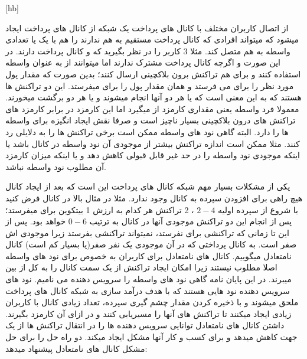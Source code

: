 [hb]



از اتصال کاربران مختلف با کانال های پرداخت یک شبکه از کانال های پرداخت ایجاد میشود که میتواند افرادی که کانال پرداخت مستقیم به هم ندارند را هم با یک یا تعدادی واسطه به هم متصل کند. مثلا 3 کاربر  را در نظر بگیرید که  و  کانال پرداخت دارند. در این صورت  و  اگرچه کانال پرداخت مشترک ندارند اما میتوانند از  به عنوان واسطه استفاده کنند و برای هم تراکنش برون بلاکچینی ارسال کنند؛ بدین صورت که  مقدار پول مورد نظر را برای  می فرستد و  همان مقدار پول را برای  میفرستد. این دو تراکنش ها  هستند که به این معنی است که یا هر دو آنها انجام میشوند و یا هر دو برگشت میخورند. معمولا فرد واسطه یعنی  مقداری کارمزد از   میگیرد اما این کارمزد در برابر کارمزد های تراکنش های درون بلاکچینی بسیار ناچیز است و صرفا نقش ایجاد انگیزه برای واسطه ها را دارد. البته گاهی نود های واسطه ممکن است برخی تراکنش ها را به دلایلی رد کنند. مثلا ممکن است اندازه تراکنش بیشتر از موجودی آن نود واسطه در کانال باشد یا اینکه موجودی نود واسطه را در حد غیر قابل قبولی کاهش دهد و یا اینکه میزان کارمزد آن مطلوب نود واسطه نباشد. 

یکی از مشکلات بسیار مهم شبکه کانال های پرداخت این است که بعد از ایجاد کانال هیچ راهی برای افزودن سپرده به کانال وجود ندارد. مثلا در مثال بالا در کانال  فرض کنید با شروع از سپرده اولیه
 $2-4$
 ، 2 تراکنش هر کدام به ارزش 1 بیتکوین برای  میفرستد؛ پس از انجام این دو تراکنش موجودی آنها در کانال به ترتیب
$0-6$   
خواهد بود. پس از این تا زمانی که   تراکنشی برای  نفرستد،  نمیتواند تراکنشی بفرستد زیرا موجودی اش صفر است. به کانال پرداختی که در آن موجودی یک نفر صفر(یا بسیار کم است) کانال نامتعادل  میگوییم. کانال های نامتعادل برای کاربران به خصوص برای نود های واسطه اصلا مطلوب نیستند زیرا امکان ایجاد تراکنش از یک سمت کانال را به کل از بین میبرند. در این پایان نامه گاهی نود های واسطه را سرویس دهنده  می نامیم. نود های سرویس دهنده نود هایی هستند که با هدف درآمد سازی به شبکه کانال های پرداخت ملحق میشوند و با ذخیره کردن مقدار چشم گیری سپرده، تعداد زیادی کانال با کاربران زیادی ایجاد میکنند تا تراکنش های آنها را مسیریابی کنند و در ازای آن کارمزد بگیرند. داشتن کانال های نامتعادل توانایی سرویس دهنده ها را در انتقال تراکنش ها از یک جهت کاهش میدهد و برای کسب و کار آنها مشکل ایجاد میکند.  دو راه حل را برای حل مشکل کانال های نامتعادل پیشنهاد میدهد:


